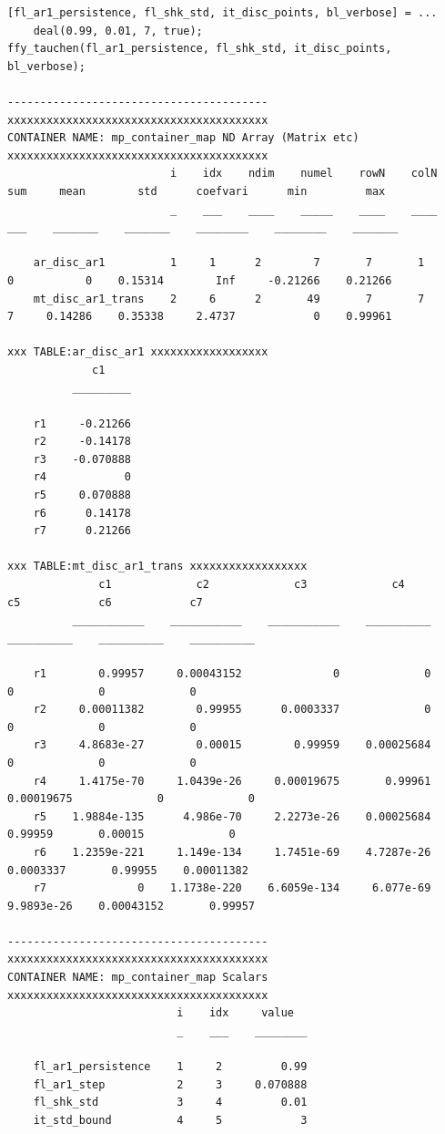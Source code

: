 \documentclass[
]{book}
\begin{document}
\begin{verbatim}
[fl_ar1_persistence, fl_shk_std, it_disc_points, bl_verbose] = ...
    deal(0.99, 0.01, 7, true);
ffy_tauchen(fl_ar1_persistence, fl_shk_std, it_disc_points, bl_verbose);

----------------------------------------
xxxxxxxxxxxxxxxxxxxxxxxxxxxxxxxxxxxxxxxx
CONTAINER NAME: mp_container_map ND Array (Matrix etc)
xxxxxxxxxxxxxxxxxxxxxxxxxxxxxxxxxxxxxxxx
                         i    idx    ndim    numel    rowN    colN    sum     mean        std      coefvari      min         max  
                         _    ___    ____    _____    ____    ____    ___    _______    _______    ________    ________    _______

    ar_disc_ar1          1     1      2        7       7       1       0           0    0.15314        Inf     -0.21266    0.21266
    mt_disc_ar1_trans    2     6      2       49       7       7       7     0.14286    0.35338     2.4737            0    0.99961

xxx TABLE:ar_disc_ar1 xxxxxxxxxxxxxxxxxx
             c1    
          _________

    r1     -0.21266
    r2     -0.14178
    r3    -0.070888
    r4            0
    r5     0.070888
    r6      0.14178
    r7      0.21266

xxx TABLE:mt_disc_ar1_trans xxxxxxxxxxxxxxxxxx
              c1             c2             c3             c4            c5            c6            c7    
          ___________    ___________    ___________    __________    __________    __________    __________

    r1        0.99957     0.00043152              0             0             0             0             0
    r2     0.00011382        0.99955      0.0003337             0             0             0             0
    r3     4.8683e-27        0.00015        0.99959    0.00025684             0             0             0
    r4     1.4175e-70     1.0439e-26     0.00019675       0.99961    0.00019675             0             0
    r5    1.9884e-135      4.986e-70     2.2273e-26    0.00025684       0.99959       0.00015             0
    r6    1.2359e-221     1.149e-134     1.7451e-69    4.7287e-26     0.0003337       0.99955    0.00011382
    r7              0    1.1738e-220    6.6059e-134     6.077e-69    9.9893e-26    0.00043152       0.99957

----------------------------------------
xxxxxxxxxxxxxxxxxxxxxxxxxxxxxxxxxxxxxxxx
CONTAINER NAME: mp_container_map Scalars
xxxxxxxxxxxxxxxxxxxxxxxxxxxxxxxxxxxxxxxx
                          i    idx     value  
                          _    ___    ________

    fl_ar1_persistence    1     2         0.99
    fl_ar1_step           2     3     0.070888
    fl_shk_std            3     4         0.01
    it_std_bound          4     5            3
\end{verbatim}
\end{document}
